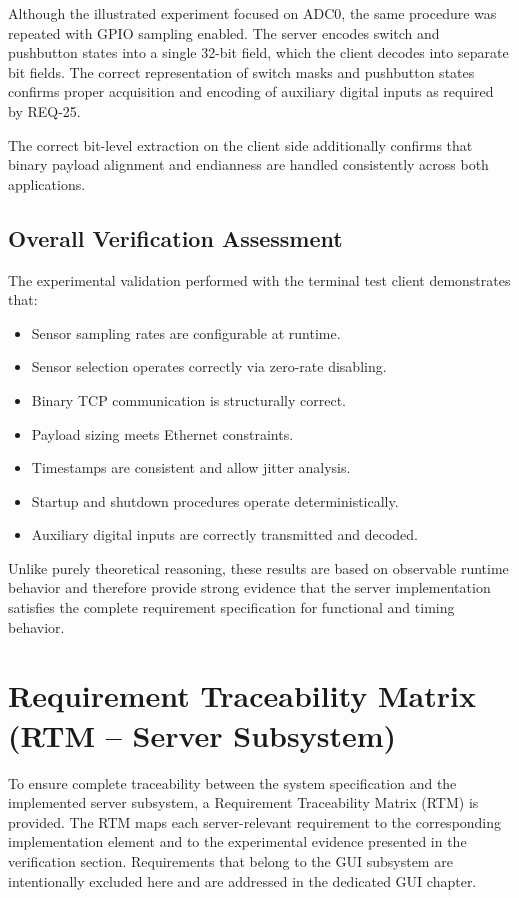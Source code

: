 Although the illustrated experiment focused on ADC0, the same procedure was repeated with GPIO sampling enabled. The server encodes switch and pushbutton states into a single 32-bit field, which the client decodes into separate bit fields. The correct representation of switch masks and pushbutton states confirms proper acquisition and encoding of auxiliary digital inputs as required by REQ-25.

The correct bit-level extraction on the client side additionally confirms that binary payload alignment and endianness are handled consistently across both applications.

\subsection{Overall Verification Assessment}

The experimental validation performed with the terminal test client demonstrates that:

\begin{itemize}
	\item Sensor sampling rates are configurable at runtime.
	\item Sensor selection operates correctly via zero-rate disabling.
	\item Binary TCP communication is structurally correct.
	\item Payload sizing meets Ethernet constraints.
	\item Timestamps are consistent and allow jitter analysis.
	\item Startup and shutdown procedures operate deterministically.
	\item Auxiliary digital inputs are correctly transmitted and decoded.
\end{itemize}

Unlike purely theoretical reasoning, these results are based on observable runtime behavior and therefore provide strong evidence that the server implementation satisfies the complete requirement specification for functional and timing behavior.

\section{Requirement Traceability Matrix (RTM -- Server Subsystem)}
\label{sec:rtm-server}

To ensure complete traceability between the system specification and the implemented server subsystem, a Requirement Traceability Matrix (RTM) is provided. The RTM maps each server-relevant requirement to the corresponding implementation element and to the experimental evidence presented in the verification section. Requirements that belong to the GUI subsystem are intentionally excluded here and are addressed in the dedicated GUI chapter.

